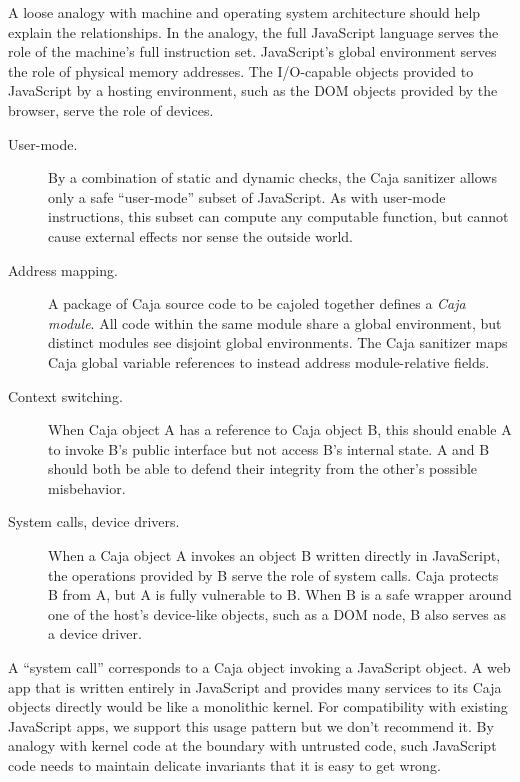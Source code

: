\documentclass[letterpaper,twocolumn,10pt]{article}
\begin{document}
A loose analogy with machine and operating system architecture should help 
explain the relationships. In the analogy, the full JavaScript language 
serves the role of the machine's full instruction set. JavaScript's global 
environment serves the role of physical memory addresses. The I/O-capable 
objects provided to JavaScript by a hosting environment, such as the DOM 
objects provided by the browser, serve the role of devices.

\begin{description}

  \item[User-mode.] By a combination of static and dynamic checks, the Caja 
  sanitizer allows only a safe ``user-mode'' subset of JavaScript. As with 
  user-mode instructions, this subset can compute any computable function, 
  but cannot cause external effects nor sense the outside world.

  \item[Address mapping.] A package of Caja source code to be cajoled 
  together defines a \emph{Caja module}. All code within the same module 
  share a global environment, but distinct modules see disjoint global 
  environments. The Caja sanitizer maps Caja global variable references to 
  instead address module-relative fields.

  \item[Context switching.] When Caja object A has a reference to Caja 
  object B, this should enable A to invoke B's public interface but not 
  access B's internal state. A and B should both be able to defend their 
  integrity from the other's possible misbehavior.

  \item[System calls, device drivers.] When a Caja object A invokes an 
  object B written directly in JavaScript, the operations provided by B serve 
  the role of system calls. Caja protects B from A, but A is fully 
  vulnerable to B. When B is a safe wrapper around one of the host's 
  device-like objects, such as a DOM node, B also serves as a device driver.

\end{description}

A ``system call'' corresponds to a Caja object invoking a JavaScript object. 
A web app that is written entirely in JavaScript and provides many services 
to its Caja objects directly would be like a monolithic kernel. For 
compatibility with existing JavaScript apps, we support this usage pattern 
but we don't recommend it. By analogy with kernel code at the boundary with 
untrusted code, such JavaScript code needs to maintain delicate invariants 
that it is easy to get wrong.
\end{document}
